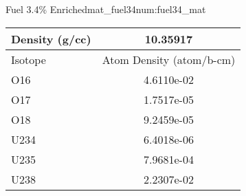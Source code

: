 \begin{matitem}{Fuel 3.4\% Enriched}{mat_fuel34}{num:fuel34_mat}
  \centering
  \begin{tabular}{l c}
    \toprule
    Density (g/cc) & 10.35917 \\
    \midrule
    Isotope & Atom Density (atom/b-cm) \\
    \midrule
    \midrule
O16 & 4.6110e-02 \\
O17 & 1.7517e-05 \\
O18 & 9.2459e-05 \\
U234 & 6.4018e-06 \\
U235 & 7.9681e-04 \\
U238 & 2.2307e-02 \\

    \bottomrule
  \end{tabular}
\end{matitem}
